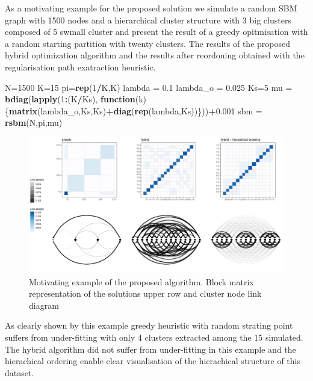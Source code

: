\documentclass[]{article}
\newenvironment{Shaded}{\begin{snugshade}}{\end{snugshade}}
\newcommand{\KeywordTok}[1]{\textcolor[rgb]{0.13,0.29,0.53}{\textbf{#1}}}
\newcommand{\DecValTok}[1]{\textcolor[rgb]{0.00,0.00,0.81}{#1}}
\newcommand{\FloatTok}[1]{\textcolor[rgb]{0.00,0.00,0.81}{#1}}
\newcommand{\StringTok}[1]{\textcolor[rgb]{0.31,0.60,0.02}{#1}}
\newcommand{\ControlFlowTok}[1]{\textcolor[rgb]{0.13,0.29,0.53}{\textbf{#1}}}
\newcommand{\OperatorTok}[1]{\textcolor[rgb]{0.81,0.36,0.00}{\textbf{#1}}}
\newcommand{\NormalTok}[1]{#1}
\begin{document}
As a motivating example for the proposed solution we simulate a random
SBM graph with 1500 nodes and a hierarchical cluster structure with 3
big clusters composed of 5 swmall cluster and present the result of a
greedy opitmisation with a random starting partition with twenty
clusters. The results of the proposed hybrid optimization algorithm and
the results after reordoning obtained with the regularisation path
exatraction heuristic.

\begin{Shaded}
\begin{Highlighting}[]
\NormalTok{N=}\DecValTok{1500}
\NormalTok{K=}\DecValTok{15}
\NormalTok{pi=}\KeywordTok{rep}\NormalTok{(}\DecValTok{1}\OperatorTok{/}\NormalTok{K,K)}
\NormalTok{lambda  =}\StringTok{ }\FloatTok{0.1}
\NormalTok{lambda_o =}\StringTok{ }\FloatTok{0.025}
\NormalTok{Ks=}\DecValTok{5}
\NormalTok{mu =}\StringTok{ }\KeywordTok{bdiag}\NormalTok{(}\KeywordTok{lapply}\NormalTok{(}\DecValTok{1}\OperatorTok{:}\NormalTok{(K}\OperatorTok{/}\NormalTok{Ks), }\ControlFlowTok{function}\NormalTok{(k)\{}\KeywordTok{matrix}\NormalTok{(lambda_o,Ks,Ks)}\OperatorTok{+}\KeywordTok{diag}\NormalTok{(}\KeywordTok{rep}\NormalTok{(lambda,Ks))\}))}\OperatorTok{+}\FloatTok{0.001}
\NormalTok{sbm =}\StringTok{ }\KeywordTok{rsbm}\NormalTok{(N,pi,mu)}
\end{Highlighting}
\end{Shaded}

\begin{figure}
\centering
\includegraphics{paper_files/figure-latex/unnamed-chunk-4-1.pdf}
\caption{Motivating example of the proposed algorithm. Block matrix
representation of the solutions upper row and cluster node link diagram}
\end{figure}

As clearly shown by this example greedy heuristic with random strating
point suffers from under-fitting with only 4 clusters extracted among
the 15 simulated. The hybrid algorithm did not suffer from under-fitting
in this example and the hierachical ordering enable clear visualisation
of the hierachical structure of this dataset.
\end{document}
